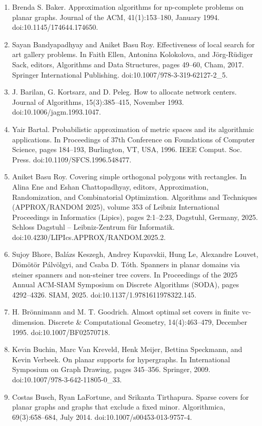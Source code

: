 \documentclass[10pt,a4paper]{article}
\begin{document}
\begin{enumerate}
\item[]  [1]  Brenda S. Baker.  Approximation algorithms for np-complete problems on planar graphs.  Journal of the ACM, 41(1):153–180, January 1994.  doi:10.1145/174644.174650.  
\item[]  [2]  Sayan Bandyapadhyay and Aniket Basu Roy.  Effectiveness of local search for art gallery problems.  In Faith Ellen, Antonina Kolokolova, and Jörg-Rüdiger Sack, editors, Algorithms and Data Structures, pages 49–60, Cham, 2017. Springer International Publishing.  doi:10.1007/978-3-319-62127-2\_5.  
\item[]  [3]  J. Barilan, G. Kortsarz, and D. Peleg.  How to allocate network centers.  Journal of Algorithms, 15(3):385–415, November 1993.  doi:10.1006/jagm.1993.1047.  
\item[]  [4]  Yair Bartal.  Probabilistic approximation of metric spaces and its algorithmic applications.  In Proceedings of 37th Conference on Foundations of Computer Science, pages 184–193, Burlington, VT, USA, 1996. IEEE Comput. Soc. Press.  doi:10.1109/SFCS.1996.548477.  
\item[]  [5]  Aniket Basu Roy.  Covering simple orthogonal polygons with rectangles.  In Alina Ene and Eshan Chattopadhyay, editors, Approximation, Randomization, and Combinatorial Optimization. Algorithms and Techniques (APPROX/RANDOM 2025), volume 353 of Leibniz International Proceedings in Informatics (Lipics), pages 2:1–2:23, Dagstuhl, Germany, 2025. Schloss Dagstuhl – Leibniz-Zentrum für Informatik.  doi:10.4230/LIPIcs.APPROX/RANDOM.2025.2.  
\item[]  [6]  Sujoy Bhore, Balázs Keszegh, Andrey Kupavskii, Hung Le, Alexandre Louvet, Dömötör Pálvölgyi, and Csaba D. Tóth.  Spanners in planar domains via steiner spanners and non-steiner tree covers.  In Proceedings of the 2025 Annual ACM-SIAM Symposium on Discrete Algorithms (SODA), pages 4292–4326. SIAM, 2025.  doi:10.1137/1.9781611978322.145.  
\item[]  [7]  H. Brönnimann and M. T. Goodrich.  Almost optimal set covers in finite vc-dimension.  Discrete \& Computational Geometry, 14(4):463–479, December 1995.  doi:10.1007/BF02570718.  
\item[]  [8]  Kevin Buchin, Marc Van Kreveld, Henk Meijer, Bettina Speckmann, and Kevin Verbeek.  On planar supports for hypergraphs.  In International Symposium on Graph Drawing, pages 345–356. Springer, 2009.  doi:10.1007/978-3-642-11805-0\_33.  
\item[]  [9]  Costas Busch, Ryan LaFortune, and Srikanta Tirthapura.  Sparse covers for planar graphs and graphs that exclude a fixed minor.  Algorithmica, 69(3):658–684, July 2014.  doi:10.1007/s00453-013-9757-4.  

\end{enumerate}
\end{document}
